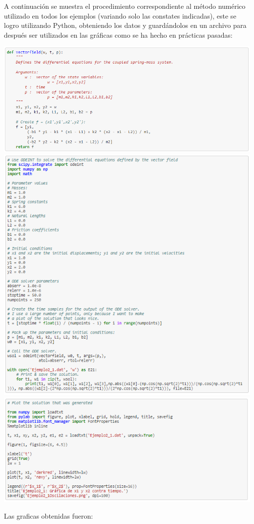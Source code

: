 \documentclass{article}
\begin{document}
A continuación se muestra el procedimiento correspondiente al método numérico utilizado en todos los ejemplos (variando solo las constates indicadas), este se logro utilizando Python, obteniendo los datos y guardándolos en un archivo para después ser utilizados en las gráficas como se ha hecho en prácticas pasadas:
\begin{center}
    \includegraphics[width=.8\textwidth]{fun.PNG}
    \includegraphics[width=.8\textwidth]{Datos1.PNG}
    \includegraphics[width=1\textwidth]{Grafica1.PNG}
\end{center}
Las graficas obtenidas fueron:
\end{document}

